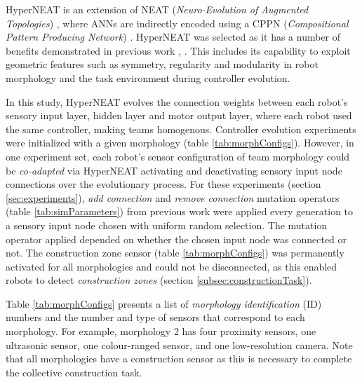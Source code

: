 \documentclass[conference]{IEEEtran}
\begin{document}
HyperNEAT \cite{StanleyDAmbrosioGauci2009} is an extension of NEAT (\textit{Neuro-Evolution of Augmented Topologies})
\cite{StanleyMiikkulainen2002}, where ANNs are indirectly encoded using a CPPN (\textit{Compositional Pattern Producing Network})
\cite{Stanley2007}.
HyperNEAT was selected as it has a number of benefits demonstrated in previous work \cite{DAmbrosio2013},
\cite{WatsonNitschke2015SSCI}.
This includes its capability to exploit geometric features such as symmetry, regularity and modularity
in robot morphology and the task environment during controller evolution.

In this study, HyperNEAT evolves the connection weights between each robot's sensory input layer,
hidden layer and motor output layer, where each robot used the same controller, making teams
homogenous.
Controller evolution experiments were initialized with a given morphology (table \ref{tab:morphConfigs}).
However, in one experiment set, each robot's sensor configuration of team morphology could be
\textit{co-adapted} via HyperNEAT activating and deactivating sensory input node connections over
the evolutionary process.
For these experiments (section \ref{sec:experiments}), \textit{add connection} and
\textit{remove connection} mutation operators (table \ref{tab:simParameters}) from previous work
\cite{HewlandNitschke2015} were applied every generation to a sensory input node
chosen with uniform random selection.  The mutation operator applied depended on whether the chosen input
node was connected or not.  The construction zone sensor (table \ref{tab:morphConfigs}) was permanently activated
for all morphologies and could not be disconnected, as this enabled robots to detect \textit{construction zones}
(section \ref{subsec:constructionTask}).

Table \ref{tab:morphConfigs} presents a list of \textit{morphology identification} (ID) numbers and the
number and type of sensors that correspond to each morphology.
For example, morphology 2 has four proximity sensors, one ultrasonic sensor, one colour-ranged sensor, and
one low-resolution camera.
Note that all morphologies have a construction sensor as this is necessary to complete the collective construction task.

\end{document}
